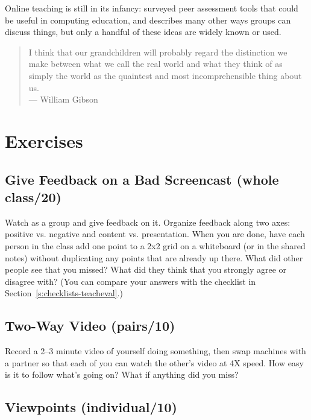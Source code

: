 Online teaching is still in its infancy: \cite{Luxt2009} surveyed
peer assessment tools that could be useful in computing education, and
\cite{Broo2016} describes many other ways groups can discuss things,
but only a handful of these ideas are widely known or used.

\begin{quote}

  I think that our grandchildren will probably regard
  the distinction we make between what we call the real world
  and what they think of as simply the world
  as the quaintest and most incomprehensible thing about us. \\
  --- William Gibson

\end{quote}

\section{Exercises}\label{s:online-exercises}

\subsection*{Give Feedback on a Bad Screencast (whole class/20)}

Watch  as a group and give
feedback on it. Organize feedback along two axes: positive
vs. negative and content vs. presentation. When you are done, have
each person in the class add one point to a 2x2 grid on a whiteboard
(or in the shared notes) without duplicating any points that are
already up there. What did other people see that you missed? What did
they think that you strongly agree or disagree with? (You can compare
your answers with the checklist in Section~\ref{s:checklists-teacheval}.)

\subsection*{Two-Way Video (pairs/10)}

Record a 2--3 minute video of yourself doing something, then swap
machines with a partner so that each of you can watch the other's video
at 4X speed. How easy is it to follow what's going on? What if anything
did you miss?

\subsection*{Viewpoints (individual/10)}

